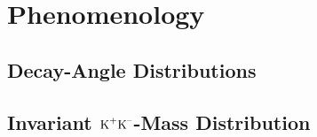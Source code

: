 \chapter{Phenomenology}
\label{chap:pheno}




\section{Decay-Angle Distributions}
\label{sec:pheno_angles}
\section{Invariant \texorpdfstring{$\text{K}^\text{+}\text{K}^\text{--}$}{KK}-Mass Distribution}
\label{sec:pheno_KKMass}
